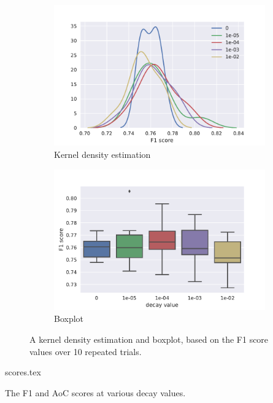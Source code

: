 \begin{figure}[tb]
  \centering
  \begin{subfigure}[t]{0.49\textwidth}
    \centering
    \includegraphics[width=\textwidth]{./figures/results/decay/kde_f1.pdf}
    \caption{Kernel density estimation}%
    \label{fig:decay_kde}
  \end{subfigure}
  \begin{subfigure}[t]{0.49\textwidth}
    \centering
    \includegraphics[width=\textwidth]{./figures/results/decay/boxplot_f1.pdf}
    \caption{Boxplot}%
    \label{fig:decay_box}
  \end{subfigure}
  \caption{A kernel density estimation and boxplot, based on the F1 score values
  over 10 repeated trials.}%
  \label{fig:decay_dists}
\end{figure}

\begin{table}[tb]
  \centering
  {scores.tex}
  \caption{The F1 and AoC scores at various decay values.}%
  \label{tbl:decay}
\end{table}

